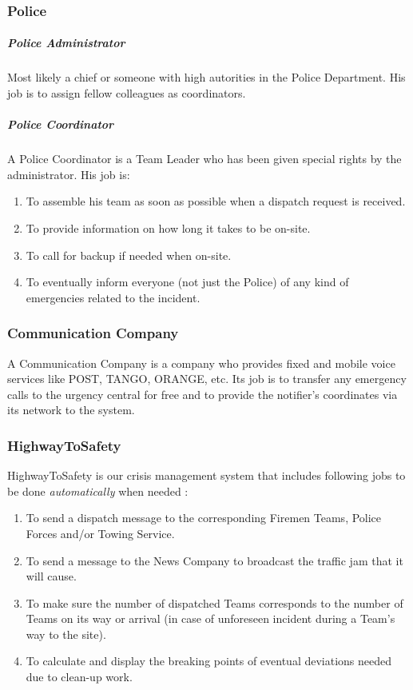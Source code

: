 \subsubsection{Police}
\subparagraph{Police Administrator}
Most likely a chief or someone with high autorities in the Police Department.
His job is to assign fellow colleagues as coordinators.

\subparagraph{Police Coordinator}
A Police Coordinator is a Team Leader who has been given special
rights by the administrator. His job is:

\begin{enumerate}
\item To assemble his team as soon as possible when a dispatch request is
received.
\item To provide information on how long it takes to be on-site.
\item To call for backup if needed when on-site.
\item To eventually inform everyone (not just the Police) of any kind
of emergencies related to the incident.
\end{enumerate}


\subsubsection{Communication Company}
A Communication Company is a company who provides fixed and mobile voice
services like POST, TANGO, ORANGE, etc. Its job is to transfer any emergency
calls to the urgency central for free and to provide the notifier's
coordinates via its network to the system.

\subsubsection{HighwayToSafety}
HighwayToSafety is our crisis management system that includes following jobs to
be done \emph{automatically} when needed :

\begin{enumerate}
\item To send a dispatch message to the corresponding Firemen Teams, Police
Forces and/or Towing Service.
\item To send a message to the News Company to broadcast the traffic jam that
it will cause.
\item To make sure the number of dispatched Teams corresponds to the number of
Teams on its way or arrival (in case of unforeseen incident during a Team's
way to the site).
\item To calculate and display the breaking points of eventual deviations needed
due to clean-up work.
\end{enumerate}

